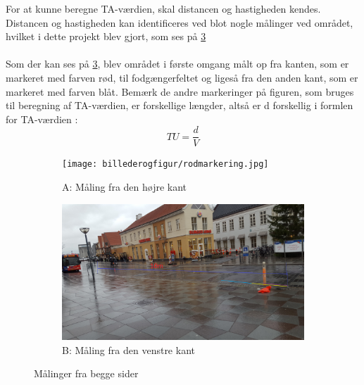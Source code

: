For at kunne beregne TA-værdien, skal distancen og hastigheden kendes. Distancen og hastigheden kan identificeres ved blot nogle målinger ved området, hvilket i dette projekt blev gjort, som ses på \cref{fig:maalingerfrabegge}
\\\\
Som der kan ses på \cref{fig:maalingerfrabegge}, blev området i første omgang målt op fra kanten, som er markeret med farven rød, til fodgængerfeltet og ligeså fra den anden kant, som er markeret med farven blåt. Bemærk de andre markeringer på figuren, som bruges til beregning af TA-værdien, er forskellige længder, altså er d forskellig i formlen for TA-værdien : $$ TU=\frac{d}{V} $$

\begin{figure}
\centering
\begin{subfigure}{1\textwidth}
  \centering
  \texttt{[image: billederogfigur/rodmarkering.jpg]}
  \caption{A: Måling fra den højre kant}
  \label{fig:obsomrrod}
\end{subfigure}
\begin{subfigure}{1\textwidth}
  \centering
  \includegraphics[width=1\linewidth]{billederogfigur/blaamarkering.jpg}
  \caption{B: Måling fra den venstre kant}
  \label{fig:obsomrblaa}
\end{subfigure}
\caption{Målinger fra begge sider}
\label{fig:maalingerfrabegge}
\end{figure}

